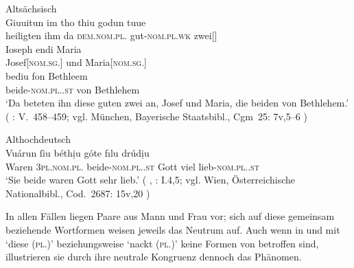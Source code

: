 \begin{exe}
\begin{xlist}
	\ex \label{ex:germbeide_4}
		\langinfo%
			{Altsächsisch}
			{}
			{\cite[nach][35]{sievers1878}}\\
		\gll Giuuitun im tho thiu godun tuue \\
			heiligten ihm da \textsc{dem.nom.pl.\NeutMF} gut-\textsc{nom.pl.wk}
			zwei[\textsc{\NeutMF}] \\
		\gll Ioseph endi Maria \\
			Josef[\textsc{nom.sg.\MascM}] und Maria[\textsc{nom.sg.\FemF}] \\
		\gll bediu fon Bethleem \\
			beide-\textsc{nom.pl.\NeutMF.st} von Bethlehem \\
		\trans `Da beteten ihn diese guten zwei an, Josef und Maria, die beiden
			von Bethlehem.'
			(%
				: V.~458--459;
				vgl. München, Bayerische Staatsbibl., Cgm~25: 7v,5--6%
			)

	\ex \label{ex:germbeide_5}
		\langinfo%
			{Althochdeutsch}
			{}
			{\cite[nach][15v]{kleiberhellgardt2004}}\\
		\gll Vuárun ſiu béthịu góte fılu drúdịu \\
			Waren \textsc{3pl.nom.pl.\NeutMF} beide-\textsc{nom.pl.\NeutMF.st}
				Gott viel lieb-\textsc{nom.pl.\NeutMF.st} \\
		\trans `Sie beide  waren Gott sehr lieb.'
			(%
				, : I.4,5;
				vgl. Wien, Österreichische Nationalbibl., Cod.~2687: 15v,20%
			)
		\\
	\end{xlist}
\end{exe}

In allen Fällen liegen Paare aus Mann und Frau vor; sich auf diese gemeinsam
beziehende Wortformen weisen jeweils das Neutrum auf. Auch wenn in
 und  mit  `diese
(\textsc{pl.\NeutMF})' beziehungsweise  `nackt
(\textsc{pl.\NeutMF})' keine Formen von  betroffen sind,
illustrieren sie durch ihre neutrale Kongruenz dennoch das Phänomen.

